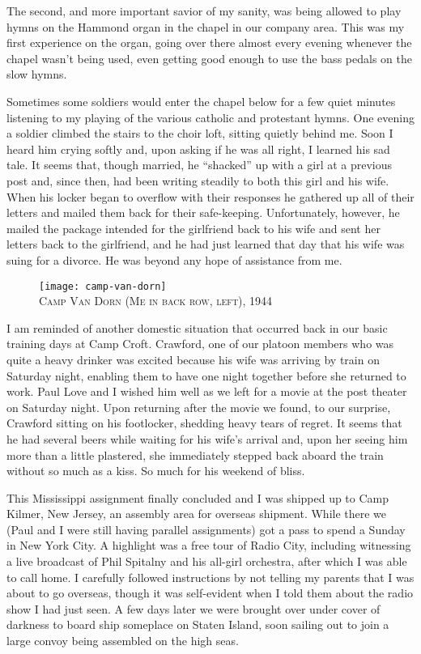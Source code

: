 \documentclass[../m3y]{subfiles}
\begin{document}
The second, and more important savior of my sanity, was being allowed to play hymns on the Hammond organ in the chapel in our company area. This was my first experience on the organ, going over there almost every evening whenever the chapel wasn't being used, even getting good enough to use the bass pedals on the slow hymns.

Sometimes some soldiers would enter the chapel below for a few quiet minutes listening to my playing of the various catholic and protestant hymns. One evening a soldier climbed the stairs to the choir loft, sitting quietly behind me. Soon I heard him crying softly and, upon asking if he was all right, I learned his sad tale. It seems that, though married, he ``shacked'' up with a girl at a previous post and, since then, had been writing steadily to both this girl and his wife. When his locker began to overflow with their responses he gathered up all of their letters and mailed them back for their safe-keeping. Unfortunately, however, he mailed the package intended for the girlfriend back to his wife and sent her letters back to the girlfriend, and he had just learned that day that his wife was suing for a divorce. He was beyond any hope of assistance from me.

\begin{figure}
\centering
\texttt{[image: camp-van-dorn]}\\
\medskip
{\newtimes\textsc{Camp Van Dorn (Me in back row, left), 1944}}
\end{figure}

I am reminded of another domestic situation that occurred back in our basic training days at Camp Croft. Crawford, one of our platoon members who was quite a heavy drinker was excited because his wife was arriving by train on Saturday night, enabling them to have one night together before she returned to work. Paul Love and I wished him well as we left for a movie at the post theater on Saturday night. Upon returning after the movie we found, to our surprise, Crawford sitting on his footlocker, shedding heavy tears of regret. It seems that he had several beers while waiting for his wife's arrival and, upon her seeing him more than a little plastered, she immediately stepped back aboard the train without so much as a kiss. So much for his weekend of bliss.

This Mississippi assignment finally concluded and I was shipped up to Camp Kilmer, New Jersey, an assembly area for overseas shipment. While there we (Paul and I were still having parallel assignments) got a pass to spend a Sunday in New York City. A highlight was a free tour of Radio City, including witnessing a live broadcast of Phil Spitalny and his all-girl orchestra, after which I was able to call home. I carefully followed instructions by not telling my parents that I was about to go overseas, though it was self-evident when I told them about the radio show I had just seen. A few days later we were brought over under cover of darkness to board ship someplace on Staten Island, soon sailing out to join a large convoy being assembled on the high seas.
\end{document}
